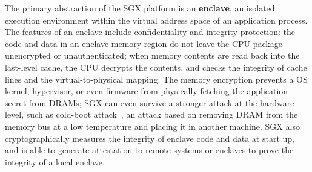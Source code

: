 The primary abstraction of the SGX platform is an {\bf enclave}, an isolated execution environment within the virtual address space of an application process.
The features of an enclave include confidentiality and integrity protection:
the code and data in an enclave memory region do not leave the CPU package unencrypted or unauthenticated; when memory contents are read back into the last-level cache,
the CPU decrypts the contents, and checks the integrity of cache lines and the virtual-to-physical mapping.
The memory encryption
prevents a OS kernel, hypervisor, or even firmware from physically fetching the application secret from DRAMs;
SGX can even survive a stronger attack at the hardware level,
such as cold-boot attack~\cite{halderman09coldboot}, an attack based on removing DRAM from the memory bus at a low temperature and placing it in another machine.
SGX also cryptographically measures the integrity of enclave code and data at start up, and
is able to generate
attestation to remote systems or enclaves to prove the integrity of a local enclave.









